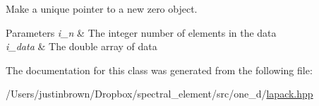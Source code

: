 Make a unique pointer to a new zero object. 



 

 
\begin{DoxyParams}{Parameters}
{\em i\-\_\-n} & The integer number of elements in the data \\
\hline
{\em i\-\_\-data} & The double array of data \\
\hline
\end{DoxyParams}


The documentation for this class was generated from the following file\-:\begin{DoxyCompactItemize}
\item 
/\-Users/justinbrown/\-Dropbox/spectral\-\_\-element/src/one\-\_\-d/\hyperlink{lapack_8hpp}{lapack.\-hpp}\end{DoxyCompactItemize}

